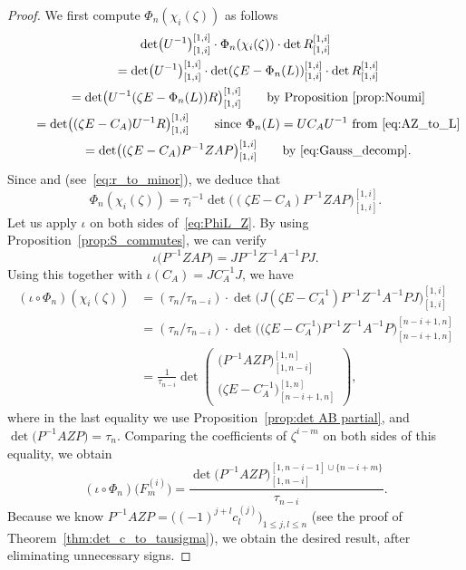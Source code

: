 \documentclass[pdftex]{sigma}
\numberwithin{equation}{section}
\theoremstyle{definition}
\begin{document}
 \begin{proof}
We first compute $\Phi_n(\chi_i(\zeta))$ as follows
\begin{gather*}
\det\bigl(U^{-1}\bigr)_{[1,i]}^{[1,i]}\cdot
\Phi_n(\chi_i(\zeta))
\cdot\det R_{[1,i]}^{[1,i]}\\
\qquad=
\det\bigl(U^{-1}\bigr)_{[1,i]}^{[1,i]}\cdot
\det(\zeta E-\Phi_n(L))_{[1,i]}^{[1,i]}
\cdot\det R_{[1,i]}^{[1,i]}\\
\qquad=
\det\bigl( U^{-1}(\zeta E-\Phi_n(L))R\bigr)_{[1,i]}^{[1,i]}\qquad\text{by Proposition~\ref{prop:Noumi}}
\\
\qquad=
\det\bigl((\zeta E-C_A) U^{-1}R\bigr)_{[1,i]}^{[1,i]}
\qquad\text{since $\Phi_n(L)=UC_AU^{-1}$ from
\eqref{eq:AZ_to_L}}\\
\qquad={\det\bigl((\zeta E-C_A)P^{-1}ZAP\bigr)_{[1,i]}^{[1,i]}} \qquad\text{by~\eqref{eq:Gauss_decomp}}.
\end{gather*}
Since  and
 (see~\eqref{eq:r_to_minor}), we deduce that
\begin{equation}\label{eq:PhiL_Z}
\Phi_n(\chi_i(\zeta))
={\tau_i}^{-1}{\det\bigl((\zeta E-C_A)P^{-1}ZAP\bigr)_{[1,i]}^{[1,i]}}.
\end{equation}
Let us apply $\iota$ on both sides of~\eqref{eq:PhiL_Z}.
By using Proposition~\ref{prop:S_commutes}, we can verify
\[
\iota\bigl(P^{-1}ZAP\bigr)=
JP^{-1}Z^{-1}A^{-1}PJ.
\]
Using this together with $\iota(C_A)=JC_A^{-1}J$, we have
\begin{align*}
(\iota\circ \Phi_n)(\chi_i(\zeta))
&=(\tau_n/\tau_{n-i})\cdot{\det\bigl(J(\zeta E-C_A^{-1})P^{-1}Z^{-1}A^{-1}PJ\bigr)_{[1,i]}^{[1,i]}}\\
&=(\tau_n/\tau_{n-i})\cdot\det\bigl(\bigl(\zeta E-C_A^{-1}\bigr)P^{-1}Z^{-1}A^{-1}P\bigr)_{[n-i+1,n]}^{[n-i+1,n]}\\
&=\frac{1}{\tau_{n-i}}
\det\left(
\begin{matrix}
\bigl(P^{-1}AZP\bigr)_{[1,n-i]}^{[1,n]}\\
\hline
\bigl(\zeta E-C_A^{-1}\bigr)_{[n-i+1,n]}^{[1,n]}
\end{matrix}
\right),
\end{align*}
where in the
last equality we use Proposition~\ref{prop:det AB partial}, and $\det\bigl(P^{-1}AZP\bigr)=\tau_n$.
Comparing the coefficients of $\zeta^{i-m}$ on both sides of this equality, we obtain
\[
(\iota\circ\Phi_n)\bigl(F^{(i)}_m\bigr)=
\frac{\det\bigl(P^{-1}AZP\bigr)_{[1,n-i]}^{[1,n-i-1]\cup\{n-i+m\}}}{\tau_{n-i}}.
\]
Because we know $P^{-1}AZP=\bigl((-1)^{j+l}c^{(j)}_{l}\bigr)_{1\le j,l\le n}$ (see the proof of Theorem~\ref{thm:det_c_to_tausigma}), we obtain the desired result, after eliminating unnecessary signs.
\end{proof}
\end{document}
